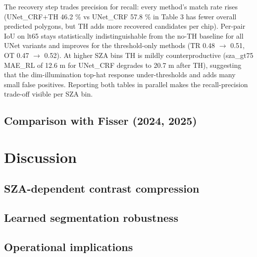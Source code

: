 \documentclass[review,jog]{igs}
\begin{document}
The recovery step trades precision for recall: every method's match rate rises (UNet\_CRF$+$TH 46.2 \% vs UNet\_CRF 57.8 \% in Table 3 has fewer overall predicted polygons, but TH adds more recovered candidates per chip). Per-pair IoU on lt65 stays statistically indistinguishable from the no-TH baseline for all UNet variants and improves for the threshold-only methods (TR 0.48 $\rightarrow$ 0.51, OT 0.47 $\rightarrow$ 0.52). At higher SZA bins TH is mildly counterproductive (sza\_gt75 MAE\_RL of 12.6 m for UNet\_CRF degrades to 20.7 m after TH), suggesting that the dim-illumination top-hat response under-thresholds and adds many small false positives. Reporting both tables in parallel makes the recall-precision trade-off visible per SZA bin.

\subsection{Comparison with Fisser (2024, 2025)}


\section{Discussion}

\subsection{SZA-dependent contrast compression}

\subsection{Learned segmentation robustness}

\subsection{Operational implications}
\end{document}
